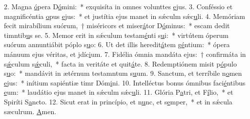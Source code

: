 2. Magna \uline{ó}pera D\uline{ó}mini:~* exquisíta in omnes volunttes \uline{e}jus.
3. Conféssio et magnificéntia \uline{o}pus \uline{e}jus:~* et justítia ejus manet in sǽculm sǽc\uline{u}li.
4. Memóriam fecit mirabílium suórum,~† miséricors et miser\uline{á}tor D\uline{ó}minus:~* escam dedit timntib\uline{u}s se.
5. Memor erit in sǽculum testam\uline{é}nti s\uline{u}i:~* virtútem óperum suórum annuntiábit póplo s\uline{u}o:
6. Ut det illis heredit\uline{á}tem g\uline{é}ntium:~* ópera mánuum ejus véritas, et jdíc\uline{i}um.
7. Fidélia ómnia mandáta ejus:~† confirmáta in s\uline{ǽ}culum s\uline{ǽ}culi,~* facta in veritáte et quit\uline{á}te.
8. Redemptiónem misit p\uline{ó}pulo s\uline{u}o:~* mandávit in ætérnum testamntum s\uline{u}um.
9. Sanctum, et terríbile n\uline{o}men \uline{e}jus:~* inítium sapiéntiæ timr Dóm\uline{i}ni.
10. Intelléctus bonus ómnibus faci\uline{é}ntibus \uline{e}um:~* laudátio ejus manet in sǽculm sǽc\uline{u}li.
11. Glória P\uline{a}tri, et F\uline{í}lio,~* et Spiríti S\uline{a}ncto.
12. Sicut erat in princípio, et n\uline{u}nc, et s\uline{e}mper,~* et in sǽcula sæculrum. \uline{A}men.
